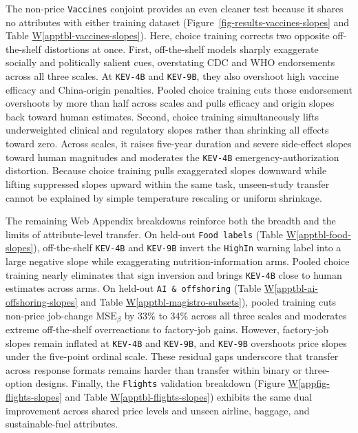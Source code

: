 \documentclass[
  11pt,
  letterpaper,
]{article}
\newcommand*\quartoapptblref[1]{Table \hyperref[#1]{W\ref{#1}}}
\newcommand*\quartoappfigref[1]{Figure \hyperref[#1]{W\ref{#1}}}
\begin{document}
The non-price \texttt{Vaccines} conjoint provides an even cleaner test
because it shares no attributes with either training dataset
(Figure~\ref{fig-results-vaccines-slopes} and
\quartoapptblref{apptbl-vaccines-slopes}). Here, choice training
corrects two opposite off-the-shelf distortions at once. First,
off-the-shelf models sharply exaggerate socially and politically salient
cues, overstating CDC and WHO endorsements across all three scales. At
\texttt{KEV-4B} and \texttt{KEV-9B}, they also overshoot high vaccine
efficacy and China-origin penalties. Pooled choice training cuts those
endorsement overshoots by more than half across scales and pulls
efficacy and origin slopes back toward human estimates. Second, choice
training simultaneously lifts underweighted clinical and regulatory
slopes rather than shrinking all effects toward zero. Across scales, it
raises five-year duration and severe side-effect slopes toward human
magnitudes and moderates the \texttt{KEV-4B} emergency-authorization
distortion. Because choice training pulls exaggerated slopes downward
while lifting suppressed slopes upward within the same task,
unseen-study transfer cannot be explained by simple temperature
rescaling or uniform shrinkage.

The remaining Web Appendix breakdowns reinforce both the breadth and the
limits of attribute-level transfer. On held-out \texttt{Food\ labels}
(\quartoapptblref{apptbl-food-slopes}), off-the-shelf \texttt{KEV-4B}
and \texttt{KEV-9B} invert the \texttt{HighIn} warning label into a
large negative slope while exaggerating nutrition-information arms.
Pooled choice training nearly eliminates that sign inversion and brings
\texttt{KEV-4B} close to human estimates across arms. On held-out
\texttt{AI\ \&\ offshoring}
(\quartoapptblref{apptbl-ai-offshoring-slopes} and
\quartoapptblref{apptbl-magistro-subsets}), pooled training cuts
non-price job-change \(\mathrm{MSE}_\beta\) by 33\% to 34\% across all
three scales and moderates extreme off-the-shelf overreactions to
factory-job gains. However, factory-job slopes remain inflated at
\texttt{KEV-4B} and \texttt{KEV-9B}, and \texttt{KEV-9B} overshoots
price slopes under the five-point ordinal scale. These residual gaps
underscore that transfer across response formats remains harder than
transfer within binary or three-option designs. Finally, the
\texttt{Flights} validation breakdown
(\quartoappfigref{appfig-flights-slopes} and
\quartoapptblref{apptbl-flights-slopes}) exhibits the same dual
improvement across shared price levels and unseen airline, baggage, and
sustainable-fuel attributes.
\end{document}
